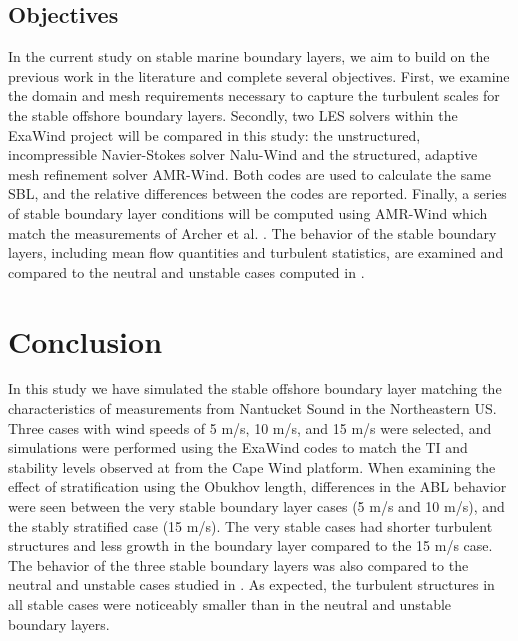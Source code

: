 \documentclass[conf]{new-aiaa}
\begin{document}
\subsection{Objectives}
In the current study on stable marine
boundary layers, we aim to build on the previous work in the
literature and complete several objectives.  First, we examine the
domain and mesh requirements necessary to capture the turbulent scales
for the stable offshore boundary layers.  Secondly, two LES solvers
within the ExaWind project will be compared in this study: the
unstructured, incompressible Navier-Stokes solver Nalu-Wind and the
structured, adaptive mesh refinement solver AMR-Wind.  Both codes are
used to calculate the same SBL, and the relative differences between
the codes are reported.  Finally, a series of stable boundary layer
conditions will be computed using AMR-Wind which match the
measurements of Archer et al. \cite{archer2016predominance}.  The
behavior of the stable boundary layers, including mean flow quantities
and turbulent statistics, are examined and compared to the neutral and
unstable cases computed in \cite{cheung2020large}.





\section{Conclusion}
In this study we have simulated the stable offshore boundary layer
matching the characteristics of measurements from Nantucket Sound in
the Northeastern US.  Three cases with wind speeds of 5 m/s, 10 m/s,
and 15 m/s were selected, and simulations were performed using the
ExaWind codes to match the TI and stability levels observed at from
the Cape Wind platform.  When examining the effect of stratification
using the Obukhov length, differences in the ABL behavior were seen
between the very stable boundary layer cases (5 m/s and 10 m/s), and
the stably stratified case (15 m/s).  The very stable cases had
shorter turbulent structures and less growth in the boundary layer
compared to the 15 m/s case.  The behavior of the three stable
boundary layers was also compared to the neutral and unstable cases
studied in \cite{cheung2020large}.  As expected, the turbulent
structures in all stable cases were noticeably smaller than in the
neutral and unstable boundary layers.
\end{document}
